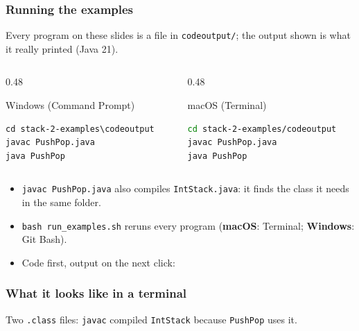 \documentclass[aspectratio=169,10pt,compress]{beamer}
\newcommand{\win}{\textbf{Windows}}
\newcommand{\mac}{\textbf{macOS}}
\begin{document}
\begin{frame}[t,fragile] \frametitle{Running the examples}
  \small Every program on these slides is a file in \texttt{codeoutput/}; the output shown is what it really printed (Java 21).
  \begin{columns}[T]
    \begin{column}{0.48\textwidth}
      \begin{block}{Windows (Command Prompt)}


\begin{lstlisting}[style=codesnippet, language={}, basicstyle=\ttfamily\scriptsize]
cd stack-2-examples\codeoutput
javac PushPop.java
java PushPop
\end{lstlisting}


      \end{block}
    \end{column}
    \begin{column}{0.48\textwidth}
      \begin{block}{macOS (Terminal)}


\begin{lstlisting}[style=codesnippet, language=bash, basicstyle=\ttfamily\scriptsize]
cd stack-2-examples/codeoutput
javac PushPop.java
java PushPop
\end{lstlisting}


      \end{block}
    \end{column}
  \end{columns}

  \begin{itemize}\small
    \item \texttt{javac PushPop.java} also compiles \texttt{IntStack.java}: it finds the class it needs in the same folder.
    \item \texttt{bash run\_examples.sh} reruns every program (\mac{}: Terminal; \win: Git Bash).
    \item Code first, output on the next click: 
  \end{itemize}
\end{frame}




\begin{frame}[t,fragile] \frametitle{What it looks like in a terminal}

  \vspace{0.1em}
  \small
  Two \texttt{.class} files: \texttt{javac} compiled \texttt{IntStack} because \texttt{PushPop} uses it.
\end{frame}
\end{document}
